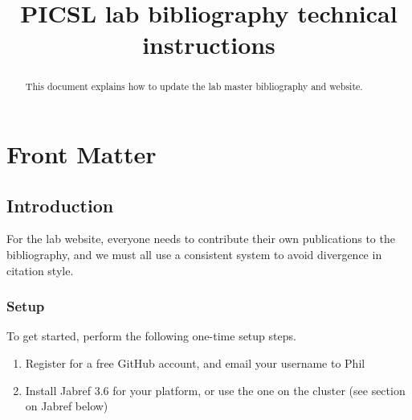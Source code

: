 \documentclass{InsightArticle}
\title{PICSL lab bibliography technical instructions}
\begin{document}
%
% 


\ifpdf
\else
\fi


\maketitle


\ifhtml
\chapter*{Front Matter\label{front}}
\fi



\begin{abstract}
\noindent This document explains how to update the lab master bibliography and website.
\end{abstract}

\tableofcontents
\newpage

\section{Introduction}

For the lab website, everyone needs to contribute their own publications to the bibliography, and we must all use a consistent system to avoid divergence in citation style.

\subsection{Setup}

To get started, perform the following one-time setup steps.

\begin{enumerate}
\item Register for a free GitHub account, and email your username to Phil
\item Install Jabref 3.6 for your platform, or use the one on the cluster (see section on Jabref below)
\end{enumerate}
\end{document}
